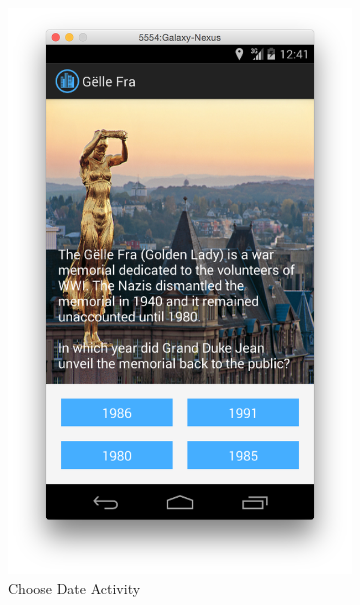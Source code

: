 \begin{figure}[H]
	\centering
	\begin{subfigure}[b]{0.3\textwidth}
                \includegraphics[width=\textwidth]{Figures/ChooseDateActivity}
                \caption{Choose Date Activity}
        \end{subfigure}%
	\begin{subfigure}[b]{0.3\textwidth}

\end{subfigure}
\end{figure}
